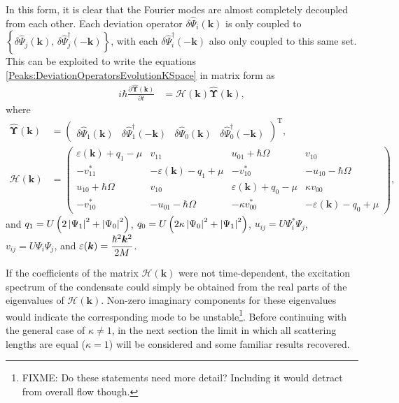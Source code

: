 In this form, it is clear that the Fourier modes are almost completely decoupled from each other. Each deviation operator $\delta\hat{\Psi}_i(\bm{k})$ is only coupled to $\left\{\delta\hat{\Psi}_j(\bm{k}),\, \delta\hat{\Psi}_j^\dagger(-\bm{k})\right\}$, with each $\delta\hat{\Psi}_i^\dagger(-\bm{k})$ also only coupled to this same set. This can be exploited to write the equations \eqref{Peaks:DeviationOperatorsEvolutionKSpace} in matrix form as
\begin{align}
    \label{Peaks:DeviationOperatorsMatrixEvolution}
    i \hbar \frac{\partial \hat{\bm{\Upsilon}}(\bm{k})}{\partial t} &= \mathcal{H}(\bm{k}) \hat{\bm{\Upsilon}}(\bm{k}),
\end{align}
where
\begin{align}
    \hat{\bm{\Upsilon}}(\bm{k}) &= 
    \begin{pmatrix}
        \delta\hat{\Psi}_1(\bm{k}) &
        \delta\hat{\Psi}_1^\dagger(-\bm{k}) &
        \delta\hat{\Psi}_0(\bm{k}) &
        \delta\hat{\Psi}_0^\dagger(-\bm{k})
    \end{pmatrix}^\text{T},\\
    \mathcal{H}(\bm{k}) &= 
    \begin{pmatrix}
        \varepsilon(\bm{k}) + q_{1} - \mu & v_{11} & u_{01} + \hbar \Omega & v_{10}\\
        -v_{11}^* & -\varepsilon(\bm{k}) - q_1 + \mu & -v_{10}^* & -u_{10} - \hbar \Omega\\
        u_{10} + \hbar \Omega & v_{10} & \varepsilon(\bm{k}) + q_0 - \mu & \kappa v_{00}\\
        -v_{10}^* & -u_{01} - \hbar \Omega & -\kappa v_{00}^* & -\varepsilon(\bm{k}) - q_0 + \mu
    \end{pmatrix},\label{Peaks:HMatrix}
\end{align}
and $q_1 = U\left(2\left|\Psi_1\right|^2+\left|\Psi_0\right|^2\right)$, $q_0 = U\left(2\kappa \left|\Psi_0\right|^2 + \left|\Psi_1\right|^2\right)$, $u_{ij} = U\Psi_i^*\Psi_j$, $v_{ij} = U\Psi_i\Psi_j$, and $\displaystyle \protect{\varepsilon(\bm{k}) = \frac{\hbar^2 \bm{k}^2}{2M}}$.

If the coefficients of the matrix $\mathcal{H}(\bm{k})$ were not time-dependent, the excitation spectrum of the condensate could simply be obtained from the real parts of the eigenvalues of $\mathcal{H}(\bm{k})$. Non-zero imaginary components for these eigenvalues would indicate the corresponding mode to be unstable\footnote{FIXME: Do these statements need more detail? Including it would detract from overall flow though.}. Before continuing with the general case of $\kappa \neq 1$, in the next section the limit in which all scattering lengths are equal ($\kappa=1$) will be considered and some familiar results recovered.

